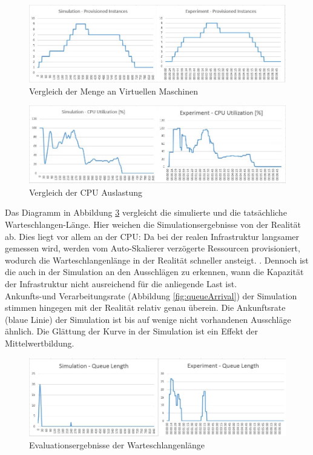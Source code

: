\begin{figure}[!h]
	\includegraphics[width=\textwidth, trim={0cm 0cm 0cm 0cm}]{img/vms.jpg}
	\caption{Vergleich der Menge an Virtuellen Maschinen}
	\label{fig:vmsResult}
\end{figure}

\begin{figure}[!h]
	\includegraphics[width=\textwidth, trim={0cm 0cm 0cm 0cm}]{img/cpu.jpg}
	\caption{Vergleich der CPU Auslastung}
	\label{fig:cpuResult}
\end{figure}

\noindent
Das Diagramm in Abbildung \ref{fig:queueLength} vergleicht die simulierte und die tatsächliche Warteschlangen-Länge. Hier weichen die Simulationsergebnisse von der Realität ab. Dies liegt vor allem an der CPU: Da bei der realen Infrastruktur langsamer gemessen wird, werden vom Auto-Skalierer verzögerte Ressourcen provisioniert, wodurch die Warteschlangenlänge in der Realität schneller ansteigt.
. Dennoch ist die auch in der Simulation an den Ausschlägen zu erkennen, wann die Kapazität der Infrastruktur nicht ausreichend für die anliegende Last ist.\\
Ankunfts-und Verarbeitungsrate (Abbildung \ref{fig:queueArrival}) der Simulation stimmen hingegen mit der Realität relativ genau überein. Die Ankunftsrate (blaue Linie) der Simulation ist bis auf wenige nicht vorhandenen  Ausschläge ähnlich. Die Glättung der Kurve in der Simulation ist ein Effekt der Mittelwertbildung. 



\begin{figure}[!h]
	\includegraphics[width=\textwidth, trim={0cm 0cm 0cm 0cm}]{img/queueLength.jpg}
	\caption{Evaluationsergebnisse der Warteschlangenlänge}
	\label{fig:queueLength}
\end{figure}


